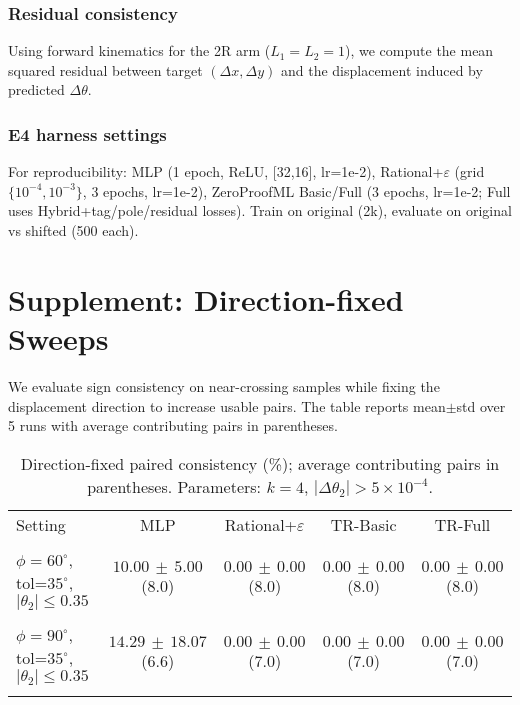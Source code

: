 \documentclass[11pt,twoside]{article}
\begin{document}
\subsubsection{Residual consistency}

Using forward kinematics for the 2R arm ($L_1=L_2=1$), we compute the mean squared residual between target $(\Delta x,\Delta y)$ and the displacement induced by predicted $\Delta\theta$.

\subsubsection{E4 harness settings}

For reproducibility: MLP (1 epoch, ReLU, [32,16], lr=1e-2), Rational+$\varepsilon$ (grid $\{10^{-4},10^{-3}\}$, 3 epochs, lr=1e-2), ZeroProofML Basic/Full (3 epochs, lr=1e-2; Full uses Hybrid+tag/pole/residual losses). Train on original (2k), evaluate on original vs shifted (500 each).

\section{Supplement: Direction-fixed Sweeps}
We evaluate sign consistency on near-crossing samples while fixing the displacement direction to increase usable pairs. The table reports mean$\pm$std over 5 runs with average contributing pairs in parentheses.

\begin{table}[h]
  \centering\small
  \begin{tabular}{lcccc}
    \toprule
    Setting & MLP & Rational+$\varepsilon$ & TR-Basic & TR-Full \\\\
    \midrule
    $\phi=60^{\circ}$, tol=$35^{\circ}$, $|\theta_2|\le0.35$ & $10.00\,\pm\,5.00$ (8.0) & $0.00\,\pm\,0.00$ (8.0) & $0.00\,\pm\,0.00$ (8.0) & $0.00\,\pm\,0.00$ (8.0) \\\\
    $\phi=90^{\circ}$, tol=$35^{\circ}$, $|\theta_2|\le0.35$ & $14.29\,\pm\,18.07$ (6.6) & $0.00\,\pm\,0.00$ (7.0) & $0.00\,\pm\,0.00$ (7.0) & $0.00\,\pm\,0.00$ (7.0) \\\\
    \bottomrule
  \end{tabular}
  \caption{Direction-fixed paired consistency (\%); average contributing pairs in parentheses. Parameters: $k=4$, $|\Delta\theta_2|>5\times10^{-4}$.}
\end{table}
\end{document}
